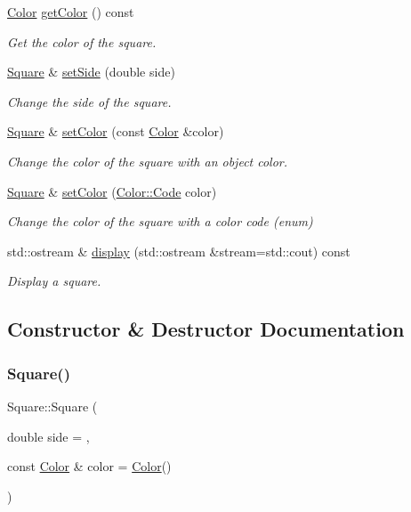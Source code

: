 \begin{DoxyCompactItemize}
\hyperlink{classColor}{Color} \hyperlink{classSquare_addb6a08f2e427f06516f81349234165d}{get\+Color} () const
\begin{DoxyCompactList}\small\item\em Get the color of the square. \end{DoxyCompactList}\item 
\hyperlink{classSquare}{Square} \& \hyperlink{classSquare_aaa6dbd70e5595f58fc243dec633d09bf}{set\+Side} (double side)
\begin{DoxyCompactList}\small\item\em Change the side of the square. \end{DoxyCompactList}\item 
\hyperlink{classSquare}{Square} \& \hyperlink{classSquare_a5d8f28334837fe3587016b98dcd7bd97}{set\+Color} (const \hyperlink{classColor}{Color} \&color)
\begin{DoxyCompactList}\small\item\em Change the color of the square with an object color. \end{DoxyCompactList}\item 
\hyperlink{classSquare}{Square} \& \hyperlink{classSquare_af60aac95044ccbcb8ba7f079a79742de}{set\+Color} (\hyperlink{classColor_a20a7b04657c1d83fae5d54514d3f1622}{Color\+::\+Code} color)
\begin{DoxyCompactList}\small\item\em Change the color of the square with a color code (enum) \end{DoxyCompactList}\item 
std\+::ostream \& \hyperlink{classSquare_a988cc14888f2a4f0b78ca48669431eb2}{display} (std\+::ostream \&stream=std\+::cout) const
\begin{DoxyCompactList}\small\item\em Display a square. \end{DoxyCompactList}\end{DoxyCompactItemize}


\subsection{Constructor \& Destructor Documentation}
\mbox{\label{classSquare_a7c70f007d73584e9414eab28a7aefe60}} 
\subsubsection{\texorpdfstring{Square()}{Square()}\hspace{0.1cm}{\footnotesize\ttfamily [1/3]}}
{\footnotesize\ttfamily Square\+::\+Square (\begin{DoxyParamCaption}\item[{double}]{side = {},  }\item[{const \hyperlink{classColor}{Color} \&}]{color = {\ttfamily \hyperlink{classColor}{Color}()} }\end{DoxyParamCaption})}



